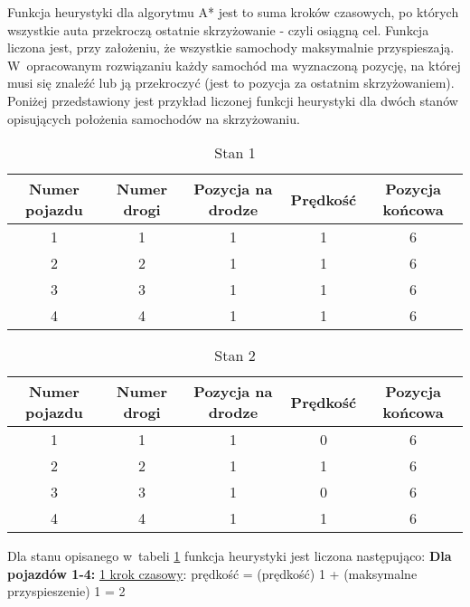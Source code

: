 Funkcja heurystyki dla algorytmu A* jest to suma kroków czasowych, po których wszystkie auta przekroczą ostatnie skrzyżowanie - czyli osiągną cel. Funkcja liczona jest, przy założeniu, że wszystkie samochody maksymalnie przyspieszają.
\newline
\indent
W~opracowanym rozwiązaniu każdy samochód ma wyznaczoną pozycję, na której musi się znaleźć lub ją przekroczyć (jest to pozycja za ostatnim skrzyżowaniem). Poniżej przedstawiony jest przykład liczonej funkcji heurystyki dla dwóch stanów opisujących położenia samochodów na skrzyżowaniu.
\newpage
\begin{table}[t]
    \begin{tabular}{|c|c|c|c|c|}
      \hline 
      Numer pojazdu & Numer drogi & Pozycja na drodze & Prędkość & Pozycja końcowa\\
      \hline
      1 & 1 & 1 & 1 & 6 \\
      \hline
      2 & 2 & 1 & 1 & 6 \\
      \hline
      3 & 3 & 1 & 1 & 6 \\
      \hline
      4 & 4 & 1 & 1 & 6 \\
      \hline
    \end{tabular} 
    \caption{Stan 1}
    \label{FirstState}
\end{table}
\begin{table}[t]
    \begin{tabular}{|c|c|c|c|c|}
      \hline 
      Numer pojazdu & Numer drogi & Pozycja na drodze & Prędkość & Pozycja końcowa\\
      \hline
      1 & 1 & 1 & 0 & 6 \\
      \hline
      2 & 2 & 1 & 1 & 6 \\
      \hline
      3 & 3 & 1 & 0 & 6 \\
      \hline
      4 & 4 & 1 & 1 & 6 \\
      \hline
    \end{tabular} 
    \caption{Stan 2}
    \label{SecondState}
\end{table}
\newpage
Dla stanu opisanego w~tabeli \ref{FirstState} funkcja heurystyki jest liczona następująco:
\newline
\newline
\textbf{Dla pojazdów 1-4:}
\newline
\newline
\underline{1 krok czasowy}:
\newline
\newline
prędkość = (prędkość) 1 + (maksymalne przyspieszenie) 1 = 2
